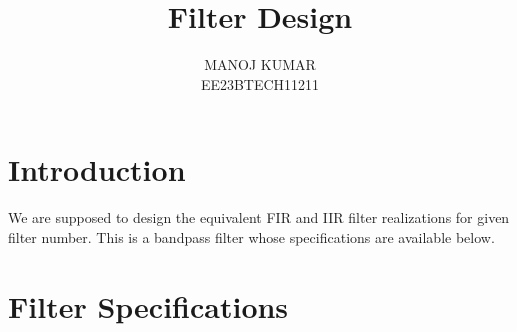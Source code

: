 \documentclass{article}
\begin{document}
\title{ \textbf{Filter Design}}

\author{MANOJ KUMAR\\EE23BTECH11211}
\date{}

\maketitle
\section{Introduction}
We are supposed to design the equivalent FIR and IIR filter realizations for given filter number.  
This is a bandpass filter whose specifications are available below.

\section{Filter Specifications}
\end{document}
